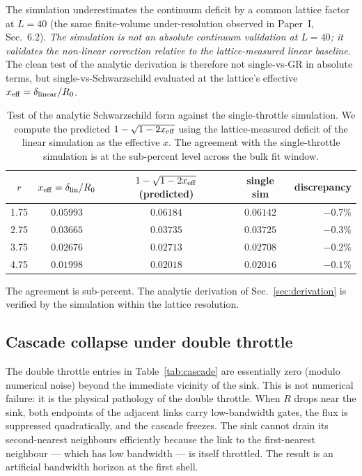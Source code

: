 \documentclass[11pt,a4paper]{article}
\begin{document}
The simulation underestimates the continuum deficit by a
common lattice factor at $L = 40$ (the same finite-volume
under-resolution observed in Paper~I, Sec.~6.2). \emph{The
simulation is not an absolute continuum validation at $L = 40$;
it validates the non-linear correction relative to the
lattice-measured linear baseline.} The clean test of the
analytic derivation is therefore not single-vs-GR in absolute
terms, but single-vs-Schwarzschild evaluated at the lattice's
effective $x_{\rm eff} = \delta_{\rm linear}/R_0$.

\begin{table}[h]
\centering
\begin{tabular}{ccccr}
\toprule
$r$ & $x_{\rm eff} = \delta_{\rm lin}/R_0$
& $1 - \sqrt{1 - 2 x_{\rm eff}}$ (predicted)
& single sim
& discrepancy\\
\midrule
1.75 & $0.05993$ & $0.06184$ & $0.06142$ & $-0.7\%$\\
2.75 & $0.03665$ & $0.03735$ & $0.03725$ & $-0.3\%$\\
3.75 & $0.02676$ & $0.02713$ & $0.02708$ & $-0.2\%$\\
4.75 & $0.01998$ & $0.02018$ & $0.02016$ & $-0.1\%$\\
\bottomrule
\end{tabular}
\caption{Test of the analytic Schwarzschild form against the
single-throttle simulation. We compute the predicted
$1 - \sqrt{1 - 2x_{\rm eff}}$ using the lattice-measured
deficit of the linear simulation as the effective $x$. The
agreement with the single-throttle simulation is at the
sub-percent level across the bulk fit window.}
\label{tab:schw_match}
\end{table}

The agreement is sub-percent. The analytic derivation of
Sec.~\ref{sec:derivation} is verified by the simulation
within the lattice resolution.

\subsection{Cascade collapse under double throttle}

The double throttle entries in Table~\ref{tab:cascade} are
essentially zero (modulo numerical noise) beyond the
immediate vicinity of the sink. This is not numerical
failure: it is the physical pathology of the double throttle.
When $R$ drops near the sink, both endpoints of the adjacent
links carry low-bandwidth gates, the flux is suppressed
quadratically, and the cascade freezes. The sink cannot drain
its second-nearest neighbours efficiently because the link to
the first-nearest neighbour --- which has low bandwidth ---
is itself throttled. The result is an artificial bandwidth
horizon at the first shell.
\end{document}
